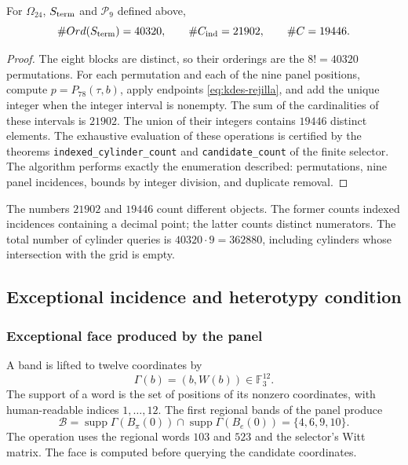 \begin{proposition}
For $\Omega_{24}$, $\mathcal S_{\rm term}$ and $\mathcal P_9$
defined above,
\[
 \#\operatorname{Ord}(\mathcal S_{\rm term})=40320,
 \qquad\#\mathcal C_{\rm ind}=21902,
 \qquad\#\mathcal C=19446.
\]
\end{proposition}
\begin{proof}
The eight blocks are distinct, so their orderings are the
$8!=40320$ permutations. For each permutation and each of the
nine panel positions, compute $p=P_{78}(\tau,b)$, apply
endpoints \eqref{eq:kdes-rejilla}, and add the unique integer when
the integer interval is nonempty. The sum of the cardinalities of these
intervals is $21902$. The union of their integers contains $19446$
distinct elements. The exhaustive evaluation of these operations
is certified by the theorems
\texttt{indexed\_cylinder\_count} and \texttt{candidate\_count} of the
finite selector. The algorithm performs exactly the enumeration
described: permutations, nine panel incidences, bounds by
integer division, and duplicate removal.
\end{proof}

The numbers $21902$ and $19446$ count different objects. The former
counts indexed incidences containing a decimal point; the latter
counts distinct numerators. The total number of cylinder queries
is $40320\cdot9=362880$, including cylinders whose intersection with
the grid is empty.

\subsection{Exceptional incidence and heterotypy condition}

\subsubsection{Exceptional face produced by the panel}

A band is lifted to twelve coordinates by
\[
 \Gamma(b)=(b,W(b))\in\mathbb F_3^{12}.
\]
The support of a word is the set of positions of its
nonzero coordinates, with human-readable indices $1,\ldots,12$. The first
regional bands of the panel produce
\begin{equation}
 \mathcal B=\operatorname{supp}\Gamma(B_\pi(0))
          \cap\operatorname{supp}\Gamma(B_e(0))
          =\{4,6,9,10\}.
 \label{eq:kdes-cara}
\end{equation}
The operation uses the regional words $103$ and $523$ and the
selector's Witt matrix. The face is computed before querying the
candidate coordinates.

